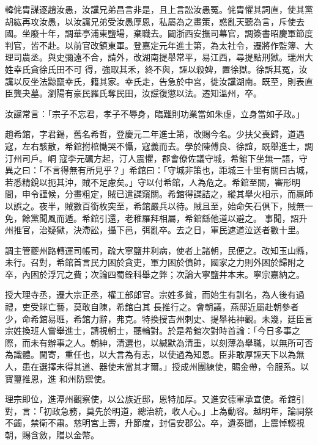 \begin{pinyinscope}
 韓侂胄謀逐趙汝愚，汝讜兄弟昌言非是，且上言訟汝愚冤。侂胄懼其詞直，使其黨胡紘再攻汝愚，以汝讜兄弟受汝愚厚恩，私屬為之畫策，惑亂天聽為言，斥使去國。坐廢十年，調華亭浦東鹽場，棄職去。闢浙西安撫司幕官，調簽書昭慶軍節度判官，皆不赴。以前官改鎮東軍。登嘉定元年進士第，為太社令，遷將作監簿、大理司農丞。與史彌遠不合，請外，改湖南提舉常平，易江西，尋提點刑獄。瑞州大姓幸氏貪徐氏田不可
 得，強取其禾，終不與，誣以殺婢，置徐獄。徐訴其冤，汝讜以反坐法黥竄幸氏，籍其家。幸氏走，告急於中宮，徙汝讜湖南。既至，則表直臣龔夬墓。瀏陽有豪民羅氏奪民田，汝讜復懲以法。遷知溫州，卒。



 汝讜常言：「宗子不忘君，孝子不辱身，臨難則功業當如朱虛，立身當如子政。」



 趙希錧，字君錫，舊名希哲，登慶元二年進士第，改賜今名。少扶父喪歸，道遇寇，左右駭散，希錧拊棺慟哭不懾，寇義而去。學於陳傅良、徐誼，既舉進士，調汀州司戶。峒
 寇李元礪方起，汀人震懼，郡會僚佐議守城，希錧下坐無一語，守異之曰：「不言得無有所見乎？」希錧曰：「守城非策也，距城三十里有關曰古城，若悉精銳以扼其沖，賊不足慮矣。」守以付希錧，人為危之。希錧至關，審形明間，申令謹候，分畫粗定，賊已遣諜窺關。希錧得諜詰之，縱其舉火相示，而羸師以誤之。夜半，賊數百銜枚突至，希錧嚴兵以待。賊且至，始命矢石俱下，賊無一免，餘黨聞風而遁。希錧引還，老稚羅拜相屬，希錧繇他道以避之。
 事聞，詔升州推官，治疑獄，決滯訟，攝下邑，弭亂卒。去之日，軍民遮道泣送者數十里。



 調主管夔州路轉運司帳司，疏大寧鹽井利病，使者上諸朝，民便之。改知玉山縣，未行。召對，希錧首言民力困於貪吏，軍力困於僨帥，國家之力則外困於歸附之卒，內困於浮冗之費；次論四蜀銓科舉之弊；次論大寧鹽井本末。寧宗嘉納之。



 授大理寺丞，遷大宗正丞，權工部郎官。宗姓多貧，而始生有訓名，為人後有過禮，吏受賕亡藝，莫敢自陳，希錧白其
 長推行之。會朝議，燕邸近屬赴朝參者少，命希錧易班，希錧力辭，弗克。特換授吉州刺史、提舉祐神觀。未幾，廷臣言宗姓換班人嘗舉進士，請視朝士，聽輪對。於是希錧次對時首論：「今日多事之際，而未有辦事之人。朝紳，清選也，以緘默為清重，以刻薄為舉職，以無所可否為識體。閫寄，重任也，以大言為有志，以使過為知恩。臣非敢厚誣天下以為無人，患在選擇未得其道、器使未當其才爾。」授成州團練使，賜金帶，令服系。以寶璽推恩，進
 和州防禦使。



 理宗即位，進潭州觀察使，以公族近邸，恩特加厚。又進安德軍承宣使。希錧引對，言：「初政急務，莫先於明道，總治統，收人心。」上為動容。越明年，論祠祭不蠲，禁衛不肅。慈明宮上壽，升節度，封信安郡公。卒，遺奏聞，上震悼輟視朝，賜含斂，贈以金幣。




\end{pinyinscope}
